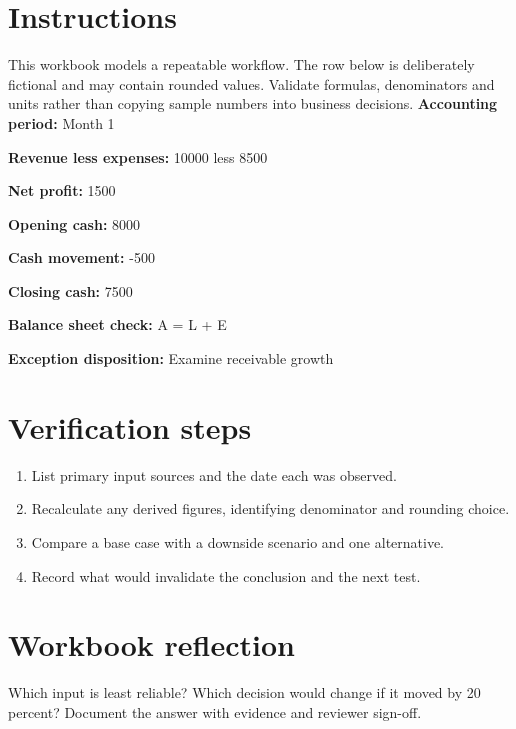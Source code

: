 \documentclass[11pt]{article}
\begin{document}
\SuiteOpen
\section{Instructions}
This workbook models a repeatable workflow. The row below is deliberately fictional and may contain rounded values. Validate formulas, denominators and units rather than copying sample numbers into business decisions.
\noindent\textbf{Accounting period:} Month 1\par\medskip
\noindent\textbf{Revenue less expenses:} 10000 less 8500\par\medskip
\noindent\textbf{Net profit:} 1500\par\medskip
\noindent\textbf{Opening cash:} 8000\par\medskip
\noindent\textbf{Cash movement:} -500\par\medskip
\noindent\textbf{Closing cash:} 7500\par\medskip
\noindent\textbf{Balance sheet check:} A = L + E\par\medskip
\noindent\textbf{Exception disposition:} Examine receivable growth\par\medskip
\section{Verification steps}
\begin{enumerate}[leftmargin=*,itemsep=5pt]
\item List primary input sources and the date each was observed.
\item Recalculate any derived figures, identifying denominator and rounding choice.
\item Compare a base case with a downside scenario and one alternative.
\item Record what would invalidate the conclusion and the next test.
\end{enumerate}

\section{Workbook reflection}
Which input is least reliable? Which decision would change if it moved by 20 percent? Document the answer with evidence and reviewer sign-off.
\end{document}
